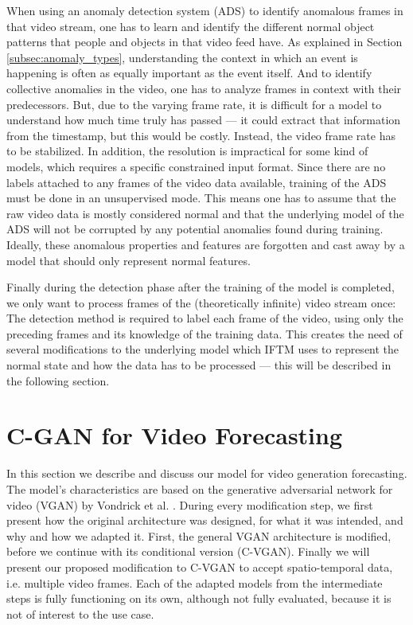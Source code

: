 When using an anomaly detection system (ADS) to identify anomalous frames in that video stream, one has to learn and identify the different normal object patterns that people and objects in that video feed have. As explained in Section \ref{subsec:anomaly_types}, understanding the context in which an event is happening is often as equally important as the event itself. And to identify collective anomalies in the video, one has to analyze frames in context with their predecessors. But, due to the varying frame rate, it is difficult for a model to understand how much time truly has passed --- it could extract that information from the timestamp, but this would be costly. Instead, the video frame rate has to be stabilized. In addition, the resolution is impractical for some kind of models, which requires a specific constrained input format. Since there are no labels attached to any frames of the video data available, training of the ADS must be done in an unsupervised mode. This means one has to assume that the raw video data is mostly considered normal and that the underlying model of the ADS will not be corrupted by any potential anomalies found during training. Ideally, these anomalous properties and features are forgotten and cast away by a model that should only represent normal features. 

Finally during the detection phase after the training of the model is completed, we only want to process frames of the (theoretically infinite) video stream once: The detection method is required to label each frame of the video, using only the preceding frames and its knowledge of the training data. This creates the need of several modifications to the underlying model which IFTM uses to represent the normal state and how the data has to be processed --- this will be described in the following section.



\section{C-GAN for Video Forecasting} \label{sec:cvgan}

In this section we describe and discuss our model for video generation forecasting. The model's characteristics are based on the generative adversarial network for video (VGAN) by Vondrick et al. \cite{vondrick2016generating}. During every modification step, we first present how the original architecture was designed, for what it was intended, and why and how we adapted it. First, the general VGAN architecture is modified, before we continue with its conditional version (C-VGAN). Finally we will present our proposed modification to C-VGAN to accept spatio-temporal data, i.e. multiple video frames. Each of the adapted models from the intermediate steps is fully functioning on its own, although not fully evaluated, because it is not of interest to the use case.


